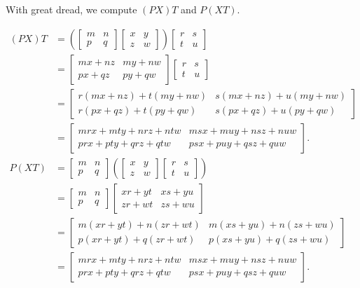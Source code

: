 \documentclass[../gatm_answers.tex]{subfiles}
\begin{document}
With great dread, we compute $(PX)T$ and $P(XT)$.

\begin{align*}
(PX)T &= \left(\begin{bmatrix} m & n \\ p & q \end{bmatrix}\begin{bmatrix} x & y \\ z & w \end{bmatrix}\right)\begin{bmatrix} r & s \\ t & u \end{bmatrix} \\
&= \begin{bmatrix} mx + nz & my + nw \\ px + qz & py + qw \end{bmatrix} \begin{bmatrix} r & s \\ t & u \end{bmatrix} \\
&= \begin{bmatrix} r(mx+nz)+t(my+nw) & s(mx+nz) + u(my+nw) \\ r(px+qz) + t(py+qw) & s(px+qz) + u(py+qw)\end{bmatrix} \\
&= \begin{bmatrix} mrx+mty+nrz+ntw & msx+muy+nsz+nuw \\ prx+pty+qrz+qtw & psx+puy+qsz+quw \end{bmatrix}. \\
P(XT) &= \begin{bmatrix} m & n \\ p & q \end{bmatrix}\left(\begin{bmatrix} x & y \\ z & w \end{bmatrix}\begin{bmatrix} r & s \\ t & u \end{bmatrix}\right) \\
&= \begin{bmatrix} m & n \\ p & q \end{bmatrix}\begin{bmatrix}xr + yt & xs + yu \\ zr + wt & zs + wu \end{bmatrix} \\
&= \begin{bmatrix} m(xr+yt) + n(zr+wt) & m(xs+yu) + n(zs+wu) \\ p(xr+yt) + q(zr+wt) & p(xs+yu) + q(zs+wu) \end{bmatrix} \\
&= \begin{bmatrix} mrx+mty+nrz+ntw & msx+muy+nsz+nuw \\ prx+pty+qrz+qtw & psx+puy+qsz+quw \end{bmatrix}.
\end{align*}
\end{document}
